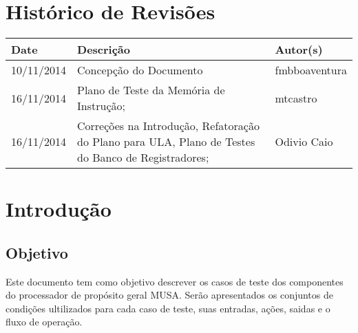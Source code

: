 \documentclass{article}
\begin{document}

\capa
\newpage

\section*{\center Histórico de Revisões}
  \vspace*{1cm}
  \begin{table}[ht]
    \centering
    \begin{tabular}[pos]{|m{2cm} | m{7.2cm} | m{3.8cm}|} 
      \hline
      \cellcolor[gray]{0.9}
      \textbf{Date} & \cellcolor[gray]{0.9}\textbf{Descrição} & \cellcolor[gray]{0.9}\textbf{Autor(s)}\\ \hline
      \hline
      \small 10/11/2014 & \small Concepção do Documento & \small fmbboaventura \\ \hline      
       \small 16/11/2014 & \small  Plano de Teste da Memória de Instrução; & \small mtcastro \\ \hline     
         \small 16/11/2014 & \small  Correções na Introdução, Refatoração do Plano para ULA, Plano de Testes do Banco de Registradores; & \small Odivio Caio \\ \hline   
   
    \end{tabular}
  \end{table}

\newpage

\tableofcontents
\newpage

\section{Introdução}

  \subsection{Objetivo}
  Este documento tem como objetivo descrever os casos de teste dos componentes do processador de propósito geral MUSA. Serão apresentados os conjuntos de condições ultilizados para cada caso de teste, suas entradas, ações, saidas e o fluxo de operação.
  
\end{document}
